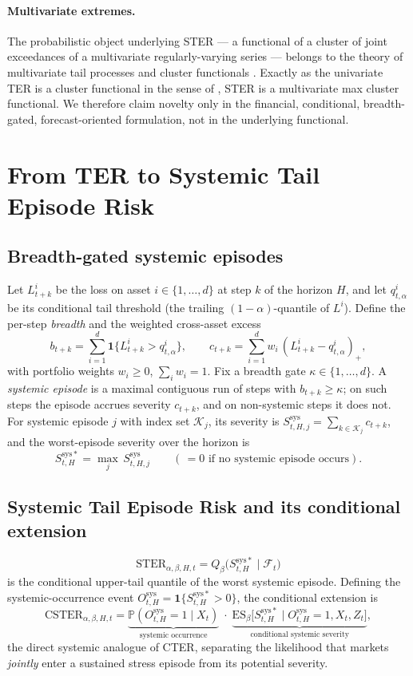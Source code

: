 \documentclass[11pt]{article}
\newcommand{\Prob}{\mathbb{P}}
\newcommand{\ES}{\mathrm{ES}}
\newcommand{\STER}{\mathrm{STER}}
\newcommand{\CSTER}{\mathrm{CSTER}}
\newcommand{\ind}{\mathbf{1}}
\begin{document}
\paragraph{Multivariate extremes.} The probabilistic object underlying STER --- a functional of a cluster of
joint exceedances of a multivariate regularly-varying series --- belongs to the theory of multivariate tail
processes and cluster functionals \citep{basraksegers2009}. Exactly as the univariate TER is a cluster
functional in the sense of \citet{segers2003}, STER is a multivariate max cluster functional. We therefore
claim novelty only in the financial, conditional, breadth-gated, forecast-oriented formulation, not in the
underlying functional.

\section{From TER to Systemic Tail Episode Risk}
\subsection{Breadth-gated systemic episodes}
Let $L^{i}_{t+k}$ be the loss on asset $i\in\{1,\dots,d\}$ at step $k$ of the horizon $H$, and let
$q^{i}_{t,\alpha}$ be its conditional tail threshold (the trailing $(1-\alpha)$-quantile of $L^{i}$). Define
the per-step \emph{breadth} and the weighted cross-asset excess
\[
b_{t+k}=\sum_{i=1}^{d}\ind\{L^{i}_{t+k}>q^{i}_{t,\alpha}\},\qquad
c_{t+k}=\sum_{i=1}^{d}w_i\,(L^{i}_{t+k}-q^{i}_{t,\alpha})_+ ,
\]
with portfolio weights $w_i\ge0$, $\sum_i w_i=1$. Fix a breadth gate $\kappa\in\{1,\dots,d\}$. A
\emph{systemic episode} is a maximal contiguous run of steps with $b_{t+k}\ge\kappa$; on such steps the
episode accrues severity $c_{t+k}$, and on non-systemic steps it does not. For systemic episode $j$ with
index set $\mathcal K_j$, its severity is $S^{\mathrm{sys}}_{t,H,j}=\sum_{k\in\mathcal K_j}c_{t+k}$, and the
worst-episode severity over the horizon is
\[
S^{\mathrm{sys}*}_{t,H}=\max_{j}\,S^{\mathrm{sys}}_{t,H,j}\qquad(\,=0\text{ if no systemic episode occurs}).
\]

\subsection{Systemic Tail Episode Risk and its conditional extension}
\[
\boxed{\ \STER_{\alpha,\beta,H,t}=Q_\beta\!\big(S^{\mathrm{sys}*}_{t,H}\mid\mathcal F_t\big)\ }
\]
is the conditional upper-tail quantile of the worst systemic episode. Defining the systemic-occurrence event
$O^{\mathrm{sys}}_{t,H}=\ind\{S^{\mathrm{sys}*}_{t,H}>0\}$, the conditional extension is
\[
\CSTER_{\alpha,\beta,H,t}=\underbrace{\Prob(O^{\mathrm{sys}}_{t,H}=1\mid X_t)}_{\text{systemic occurrence}}
\;\cdot\;\underbrace{\ES_\beta\big[S^{\mathrm{sys}*}_{t,H}\mid O^{\mathrm{sys}}_{t,H}=1,X_t,Z_t\big]}_{\text{conditional systemic severity}},
\]
the direct systemic analogue of CTER, separating the likelihood that markets \emph{jointly} enter a
sustained stress episode from its potential severity.
\end{document}

